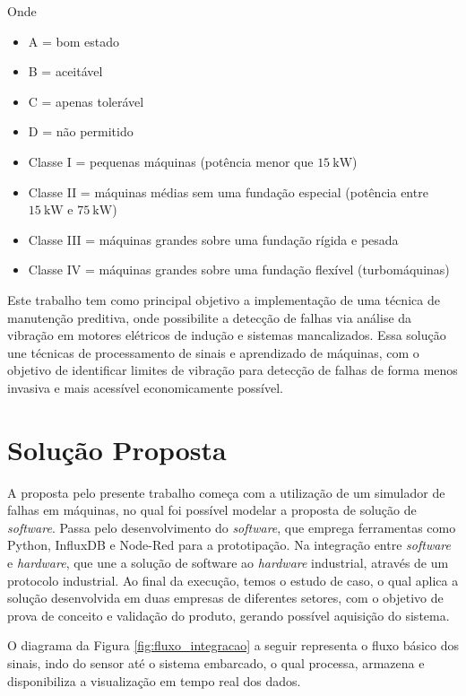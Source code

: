 \documentclass[a4paper]{ifacconf}
\begin{document}
Onde

\begin{itemize}
    \item A = bom estado
    \item B = aceitável
    \item C = apenas tolerável
    \item D = não permitido
    \item Classe I = pequenas máquinas (potência menor que $\SI{15}{\kilo\watt}$)
    \item Classe II = máquinas médias sem uma fundação especial (potência entre $\SI{15}{\kilo\watt}$ e $\SI{75}{\kilo\watt}$)
    \item Classe III = máquinas grandes sobre uma fundação rígida e pesada
    \item Classe IV = máquinas grandes sobre uma fundação flexível (turbomáquinas) 
\end{itemize}


Este trabalho tem como principal objetivo a implementação de uma técnica de manutenção preditiva, onde possibilite a detecção
de falhas via análise da vibração em motores elétricos de indução e sistemas mancalizados. Essa solução une técnicas de processamento de 
sinais e aprendizado de máquinas, com o objetivo de identificar limites de vibração para detecção de falhas de forma menos invasiva e mais 
acessível economicamente possível. 



\section{Solução Proposta}

A proposta pelo presente trabalho começa com a utilização de um simulador de falhas em máquinas, no qual foi possível modelar a 
proposta de solução de \textit{software}. Passa pelo desenvolvimento do \textit{software}, que emprega ferramentas como Python, InfluxDB e 
Node-Red para a prototipação. 
Na integração entre \textit{software} e \textit{hardware}, que une a solução de software ao \textit{hardware} industrial, através de um 
protocolo industrial. Ao final da execução, temos o estudo de caso, o qual aplica a solução desenvolvida em duas empresas de diferentes setores,
com o objetivo de prova de conceito e validação do produto, gerando possível aquisição do sistema. 

O diagrama da Figura \ref{fig:fluxo_integracao} a seguir representa o fluxo básico dos sinais, indo do sensor até o sistema embarcado, o qual processa, armazena e 
disponibiliza a visualização em tempo real dos dados.
\end{document}
